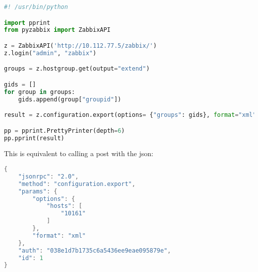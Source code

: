 \begin{lstlisting}[language=python]
#! /usr/bin/python

import pprint
from pyzabbix import ZabbixAPI

z = ZabbixAPI('http://10.112.77.5/zabbix/')
z.login("admin", "zabbix")

groups = z.hostgroup.get(output="extend")

gids = []
for group in groups:
    gids.append(group["groupid"])

result = z.configuration.export(options= {"groups": gids}, format="xml")

pp = pprint.PrettyPrinter(depth=6)
pp.pprint(result)
\end{lstlisting}

This is equivalent to calling a post with the json: 

\begin{lstlisting}[language=java]
{
    "jsonrpc": "2.0",
    "method": "configuration.export",
    "params": {
        "options": {
            "hosts": [
                "10161"
            ]
        },
        "format": "xml"
    },
    "auth": "038e1d7b1735c6a5436ee9eae095879e",
    "id": 1
}
\end{lstlisting}